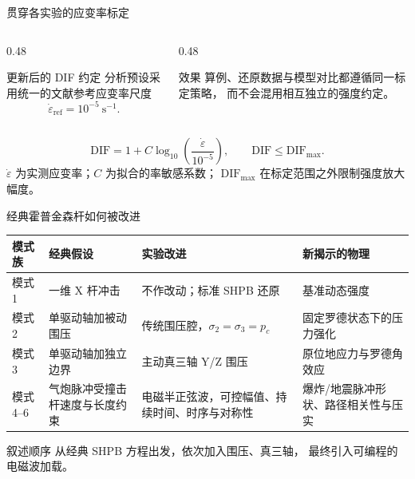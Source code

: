 \documentclass[11pt,aspectratio=169]{beamer}
\newcommand{\toprule}{\hline}
\newcommand{\midrule}{\hline}
\newcommand{\bottomrule}{\hline}
\newcommand{\cncue}[1]{{\footnotesize\color{TUSTmidgray} #1}}
\begin{document}
\begin{frame}{贯穿各实验的应变率标定}
  \small
  \begin{columns}[T,onlytextwidth]
    \begin{column}{0.48\textwidth}
      \begin{alertblock}{更新后的 DIF 约定}
        分析预设采用统一的文献参考应变率尺度
        \[
          \dot{\varepsilon}_{\mathrm{ref}} = 10^{-5}\ \mathrm{s}^{-1}.
        \]
      \end{alertblock}
    \end{column}
    \begin{column}{0.48\textwidth}
      \begin{block}{效果}
        算例、还原数据与模型对比都遵循同一标定策略，
        而不会混用相互独立的强度约定。
      \end{block}
    \end{column}
  \end{columns}
  \vspace{0.2cm}
  \[
    \mathrm{DIF} = 1 + C\log_{10}\!\left(\frac{\dot{\varepsilon}}
    {10^{-5}}\right), \qquad \mathrm{DIF}\le \mathrm{DIF}_{\max}.
  \]
  \cncue{$\dot{\varepsilon}$ 为实测应变率；$C$ 为拟合的率敏感系数；
  $\mathrm{DIF}_{\max}$ 在标定范围之外限制强度放大幅度。}
\end{frame}

\begin{frame}{经典霍普金森杆如何被改进}
  \scriptsize
  \begin{tabular}{@{}p{}p{}p{}p{}@{}}
    \toprule
    \textbf{模式族} & \textbf{经典假设} & \textbf{实验改进} & \textbf{新揭示的物理} \\
    \midrule
    模式 1 & 一维 X 杆冲击 & 不作改动；标准 SHPB 还原 & 基准动态强度 \\
    模式 2 & 单驱动轴加被动围压 & 传统围压腔，$\sigma_2=\sigma_3=p_c$ & 固定罗德状态下的压力强化 \\
    模式 3 & 单驱动轴加独立边界 & 主动真三轴 Y/Z 围压 & 原位地应力与罗德角效应 \\
    模式 4--6 & 气炮脉冲受撞击杆速度与长度约束 & 电磁半正弦波，可控幅值、持续时间、时序与对称性 & 爆炸/地震脉冲形状、路径相关性与压实 \\
    \bottomrule
  \end{tabular}
  \vspace{0.25cm}
  \begin{block}{叙述顺序}
    从经典 SHPB 方程出发，依次加入围压、真三轴，
    最终引入可编程的电磁波加载。
  \end{block}
\end{frame}
\end{document}
